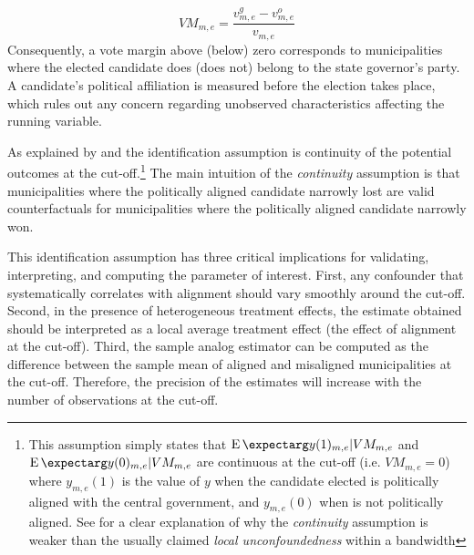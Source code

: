 \documentclass[dv_diss_main.tex]{subfiles}
\begin{document}
\begin{equation}\label{eq:margin}
VM_{m,e}=\frac{v^g_{m,e}-v^o_{m,e}}{v_{m,e}}
\end{equation}
Consequently, a vote margin above (below) zero corresponds to municipalities where the elected candidate does (does not) belong to the state governor's party. A candidate's political affiliation is measured before the election takes place, which rules out any concern regarding unobserved characteristics affecting the running variable. 

As explained by \cite{hahn2001identification} and \cite{de2016misunderstandings} the identification assumption is continuity of the potential outcomes at the cut-off.\footnote{ This assumption simply states that  $\expect{y(1)_{m,e}|VM_{m,e}}$  and $\expect{y(0)_{m,e}|VM_{m,e}}$ are continuous at the cut-off (i.e. $VM_{m,e}=0$) where $y_{m,e}(1)$ is the value of $y$ when the candidate elected is politically aligned with the central government, and $y_{m,e}(0)$ when is not politically aligned. See \cite{de2016misunderstandings} for a clear explanation of why the \textit{continuity} assumption is weaker than the usually claimed \textit{local unconfoundedness} within a bandwidth} The main intuition of the \textit{continuity} assumption is that municipalities where the politically aligned candidate narrowly lost are valid counterfactuals for municipalities where the politically aligned candidate narrowly won. 

This identification assumption has three critical implications for validating, interpreting, and computing the parameter of interest. 
First, any confounder that systematically correlates with alignment should vary smoothly around the cut-off. 
Second, in the presence of heterogeneous treatment effects, the estimate obtained should be interpreted as a local average treatment effect (the effect of alignment at the cut-off). 
Third, the sample analog estimator can be computed as the difference between the sample mean of aligned and misaligned municipalities at the cut-off. Therefore, the precision of the estimates will increase with the number of observations at the cut-off. 
\end{document}

